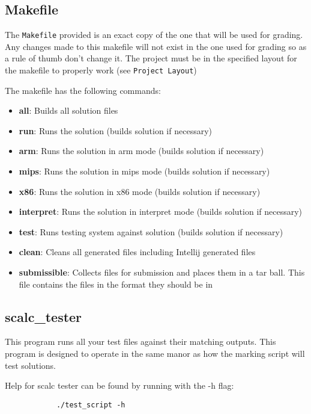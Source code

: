 \documentclass{article}
\begin{document}
	\subsection{Makefile}

		The \texttt{Makefile} provided is an exact copy of the one that will be used for grading.  Any changes made to
		this makefile will not exist in the one used for grading so as a rule of thumb don't change it. The project must
		be in the specified layout for the makefile to properly work (see \texttt{Project Layout})

		The makefile has the following commands:

		\begin{itemize}
			\item{\textbf{all}}: Builds all solution files
			\item{\textbf{run}}: Runs the solution (builds solution if necessary)
			\item{\textbf{arm}}: Runs the solution in arm mode (builds solution if necessary)
			\item{\textbf{mips}}: Runs the solution in mips mode (builds solution if necessary)
			\item{\textbf{x86}}: Runs the solution in x86 mode (builds solution if necessary)
			\item{\textbf{interpret}}: Runs the solution in interpret mode (builds solution if necessary)
			\item{\textbf{test}}: Runs testing system against solution (builds solution if necessary)
			\item{\textbf{clean}}: Cleans all generated files including Intellij generated files
			\item{\textbf{submissible}}: Collects files for submission and places them in a tar ball. This file contains
			the files in the format they should be in
		\end{itemize}

	\subsection{scalc\_tester}

		This program runs all your test files against their matching outputs. This program is designed to operate in the
		same manor as how the marking script will test solutions.

		Help for scalc tester can be found by running with the -h flag:

		\begin{lstlisting}
			./test_script -h
		\end{lstlisting}
\end{document}
